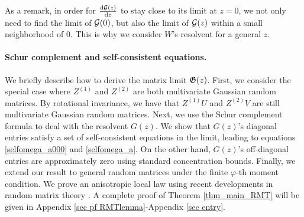 As a remark, in order for $\frac{\dd \cal G(z)}{\dd z}$ to stay close to its limit at $z = 0$, we not only need to find the limit of $\cal G(0)$, but also the limit of $\cal G(z)$ within a small neighborhood of $0$.
This is why we consider $W$'s resolvent for a general $z$. %

\paragraph{Schur complement and self-consistent equations.}
We briefly describe how to derive the matrix limit $\Gi(z)$.
First, we consider the special case where $Z^{(1)}$ and $Z^{(2)}$ are both multivariate Gaussian random matrices.
By rotational invariance, we have that $Z^{(1)} U$ and $Z^{(2)} V$ are still multivariate Gaussian random matrices.
Next, we use the Schur complement formula to deal with the resolvent $G(z)$.
We show that $G(z)$'s diagonal entries satisfy a set of self-consistent equations in the limit, leading to equations \eqref{selfomega_a000} and \eqref{selfomega_a}.
On the other hand, $G(z)$'s off-diagonal entries are approximately zero using standard concentration bounds.
Finally, we extend our result to general random matrices under the finite $\varphi$-th moment condition.
We prove an anisotropic local law using recent developments in random matrix theory \cite{erdos2017dynamical,Anisotropic}.
A complete proof of Theorem \ref{thm_main_RMT} will be given in Appendix \ref{sec pf RMTlemma}-Appendix \ref{sec entry}. %













